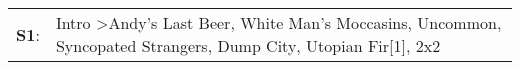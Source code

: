 \begin{supertabular}{p{0.03\textwidth}p{0.92\textwidth}}
 \textbf{S1}:  &  Intro\textsuperscript{} \textgreater \enspace Andy's Last Beer\textsuperscript{}, \enspace White Man's Moccasins\textsuperscript{}, \enspace Uncommon\textsuperscript{}, \enspace Syncopated Strangers\textsuperscript{}, \enspace Dump City\textsuperscript{}, \enspace Utopian Fir[1]\textsuperscript{}, \enspace 2x2\textsuperscript{}  \enspace  \\
\end{supertabular}
